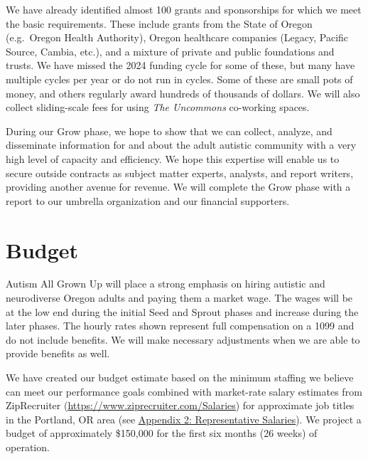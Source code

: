 \documentclass[
  letterpaper,
  DIV=11,
  numbers=noendperiod]{scrreprt}
\begin{document}
We have already identified almost 100 grants and sponsorships for which
we meet the basic requirements. These include grants from the State of
Oregon (e.g.~Oregon Health Authority), Oregon healthcare companies
(Legacy, Pacific Source, Cambia, etc.), and a mixture of private and
public foundations and trusts. We have missed the 2024 funding cycle for
some of these, but many have multiple cycles per year or do not run in
cycles. Some of these are small pots of money, and others regularly
award hundreds of thousands of dollars. We will also collect
sliding-scale fees for using \emph{The Uncommons} co-working spaces.

During our Grow phase, we hope to show that we can collect, analyze, and
disseminate information for and about the adult autistic community with
a very high level of capacity and efficiency. We hope this expertise
will enable us to secure outside contracts as subject matter experts,
analysts, and report writers, providing another avenue for revenue. We
will complete the Grow phase with a report to our umbrella organization
and our financial supporters.


\hypertarget{budget}{%
\chapter{Budget}\label{budget}}

Autism All Grown Up will place a strong emphasis on hiring autistic and
neurodiverse Oregon adults and paying them a market wage. The wages will
be at the low end during the initial Seed and Sprout phases and increase
during the later phases. The hourly rates shown represent full
compensation on a 1099 and do not include benefits. We will make
necessary adjustments when we are able to provide benefits as well.

We have created our budget estimate based on the minimum staffing we
believe can meet our performance goals combined with market-rate salary
estimates from ZipRecruiter
(\href{https://www.ziprecruiter.com/Salaries}{\uline{https://www.ziprecruiter.com/Salaries}})
for approximate job titles in the Portland, OR area (see
\protect\hyperlink{appendix-2-representative-salaries}{\uline{Appendix
2: Representative Salaries}}). We project a budget of approximately
\$150,000 for the first six months (26 weeks) of operation.

\hypertarget{section-1}{%
\section{}\label{section-1}}
\end{document}
